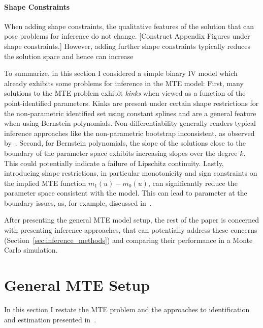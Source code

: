 \documentclass[12pt,a4paper,english]{article} %
\numberwithin{equation}{section}
\theoremstyle{definition}
\theoremstyle{remark}
\theoremstyle{plain}
\begin{document}
\paragraph{Shape Constraints}
When adding shape constraints, the qualitative features of the solution that can pose problems for inference do not change.
[Construct Appendix Figures under shape constraints.]
However, adding further shape constraints typically reduces the solution space and hence can increase

To summarize, in this section I considered a simple binary IV model which already exhibits some problems for inference in the MTE model:
First, many solutions to the MTE problem exhibit \textit{kinks} when viewed as a function of the point-identified parameters.
Kinks are present under certain shape restrictions for the non-parametric identified set using constant splines and are a general feature when using Bernstein polynomials.
Non-differentiability generally renders typical inference approaches like the non-parametric bootstrap inconsistent, as observed by~\cite{dumbgen1993nondifferentiable}.
Second, for Bernstein polynomials, the slope of the solutions close to the boundary of the parameter space exhibits increasing slopes over the degree $k$.
This could potentially indicate a failure of Lipschitz continuity.
Lastly, introducing shape restrictions, in particular monotonicity and sign constraints on the implied MTE function $m_1(u) - m_0(u)$, can significantly reduce the parameter space consistent with the model.
This can lead to parameter at the boundary issues, as, for example, discussed in~\cite{andrews1999estimation}.

After presenting the general MTE model setup, the rest of the paper is concerned with presenting inference approaches, that can potentially address these concerns (Section~\ref{sec:inference_methods}) and comparing their performance in a Monte Carlo simulation.

\section{General MTE Setup}\label{sec:general_mte}
In this section I restate the MTE problem and the approaches to identification and estimation presented in~\cite{mogstad2018using}.
\end{document}
